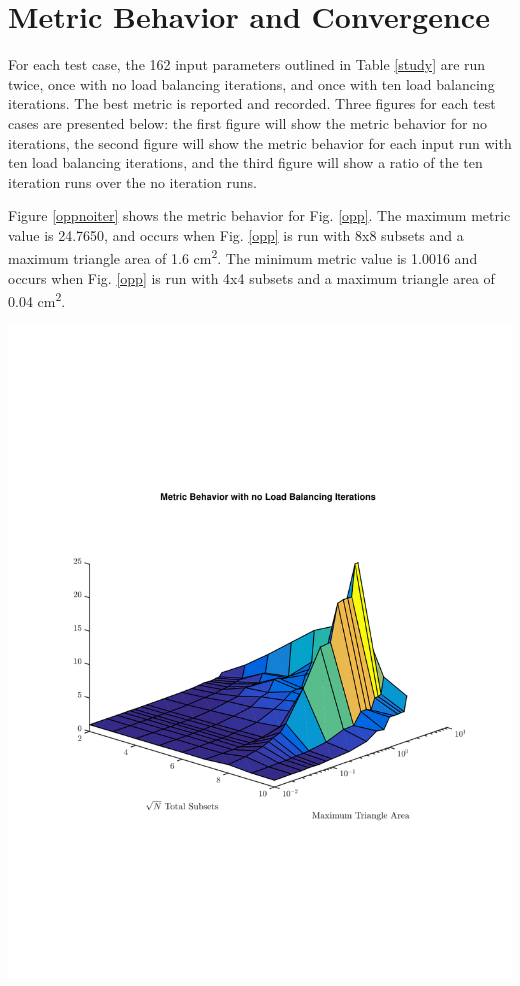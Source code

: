 \section{Metric Behavior and Convergence}

For each test case, the 162 input parameters outlined in Table \ref{study} are run twice, once with no load balancing iterations, and once with ten load balancing iterations. The best metric is reported and recorded. Three figures for each test cases are presented below: the first figure will show the metric behavior for no iterations, the second figure will show the metric behavior for each input run with ten load balancing iterations, and the third figure will show a ratio of the ten iteration runs over the no iteration runs.

Figure \ref{oppnoiter} shows the metric behavior for Fig. \ref{opp}. The maximum metric value is 24.7650, and occurs when Fig. \ref{opp} is run with 8x8 subsets and a maximum triangle area of 1.6 cm\textsuperscript{2}. The minimum metric value is 1.0016 and occurs when Fig. \ref{opp} is run with 4x4 subsets and a maximum triangle area of 0.04 cm\textsuperscript{2}. 

\noindent\begin{minipage}{\textwidth}
\centering
\includegraphics[scale=0.75, trim = 0cm 2cm 0cm 3cm,clip]{figures/OppNoIter.pdf}
\label{oppnoiter}
\end{minipage}

